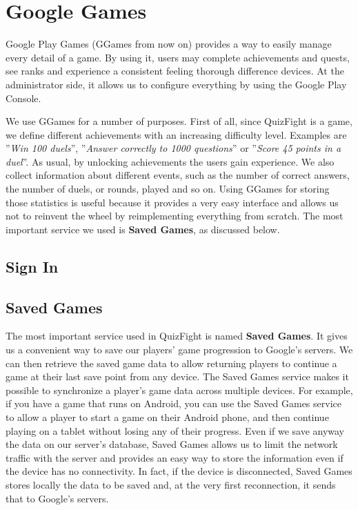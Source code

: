 \section{Google Games}
Google Play Games (GGames from now on) provides a way to easily manage every detail of a game. By using it, users may complete achievements and quests, see ranks and experience a consistent feeling thorough difference devices. At the administrator side, it allows us to configure everything by using the Google Play Console.

We use GGames for a number of purposes. First of all, since QuizFight is a game, we define different achievements with an increasing difficulty level. Examples are ''\textit{Win 100 duels}'', ''\textit{Answer correctly to 1000 questions}'' or ''\textit{Score 45 points in a duel}''. As usual, by unlocking achievements the users gain experience. We also collect information about different events, such as the number of correct answers, the number of duels, or rounds, played and so on. Using GGames for storing those statistics is useful because it provides a very easy interface and allows us not to reinvent the wheel by reimplementing everything from scratch. The most important service we used is \textbf{Saved Games}, as discussed below.

\subsection{Sign In}

\subsection{Saved Games}
The most important service used in QuizFight is named \textbf{Saved Games}. It gives us a convenient way to save our players' game progression to Google's servers. We can then retrieve the saved game data to allow returning players to continue a game at their last save point from any device. The Saved Games service makes it possible to synchronize a player's game data across multiple devices. For example, if you have a game that runs on Android, you can use the Saved Games service to allow a player to start a game on their Android phone, and then continue playing on a tablet without losing any of their progress. Even if we save anyway the data on our server's database, Saved Games allows us to limit the network traffic with the server and provides an easy way to store the information even if the device has no connectivity. In fact, if the device is disconnected, Saved Games stores locally the data to be saved and, at the very first reconnection, it sends that to Google's servers.

